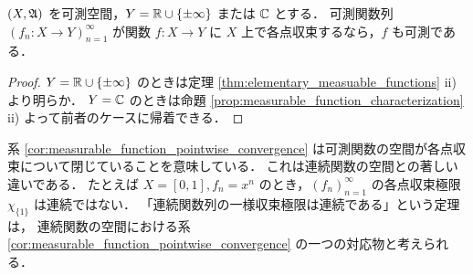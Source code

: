 \begin{corollary}\label{cor:measurable_function_pointwise_convergence}
    $(X,\mathfrak{A})$ を可測空間，$Y=\mathbb{R}\cup\{\pm\infty\}$ または $\mathbb{C}$ とする．
    可測関数列 $(f_n:X\to Y)_{n=1}^\infty$ が関数 $f:X\to Y$ に $X$ 上で各点収束するなら，$f$ も可測である．
\end{corollary}

\begin{proof}
    $Y=\mathbb{R}\cup\{\pm\infty\}$ のときは定理 \ref{thm:elementary_measuable_functions} \textrm{ii)} より明らか．
    $Y=\mathbb{C}$ のときは命題 \ref{prop:measurable_function_characterization} \textrm{ii)} よって前者のケースに帰着できる．
\end{proof}

\begin{remark}
    系 \ref{cor:measurable_function_pointwise_convergence} は可測関数の空間が各点収束について閉じていることを意味している．
    これは連続関数の空間との著しい違いである．
    たとえば $X=[0,1],f_n=x^n$ のとき，$(f_n)_{n=1}^\infty$ の各点収束極限 $\chi_{\{1\}}$ は連続ではない．
    「連続関数列の一様収束極限は連続である」という定理は，
    連続関数の空間における系 \ref{cor:measurable_function_pointwise_convergence} の一つの対応物と考えられる．
\end{remark}
